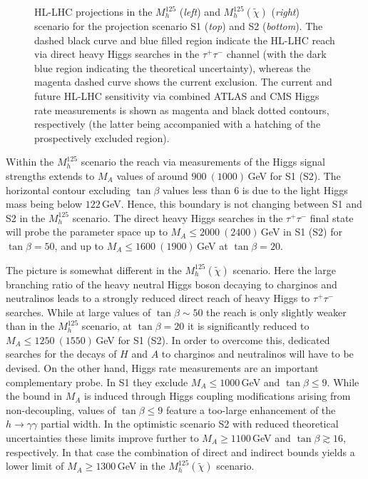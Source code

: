 \documentclass[../report.tex]{subfiles}
\begin{document}
\begin{figure}
\begin{center}
\end{center}
\caption{HL-LHC projections in the $M_h^{125}$ (\emph{left}) and
  $M_h^{125}(\tilde{\chi})$ (\emph{right}) scenario for the projection scenario S1 (\emph{top}) and S2 (\emph{bottom}). The dashed black curve and blue filled region indicate the HL-LHC reach via direct heavy Higgs searches in the $\tau^+\tau^-$ channel (with the dark blue region indicating the theoretical uncertainty), whereas the magenta dashed curve shows the current exclusion. The current and future HL-LHC sensitivity via  combined ATLAS and CMS Higgs rate measurements is shown as magenta and black dotted contours, respectively (the latter being accompanied with a hatching of the prospectively excluded region).}
\label{fig:bench}
\end{figure}

Within the $M_h^{125}$ scenario the reach via measurements of the Higgs signal strengths extends to $M_A$ values of around $900~(1000)$\,GeV for S1 (S2). The horizontal contour excluding $\tan\beta$ values less than 6 is due to the light Higgs mass being below $122$\,GeV. Hence, this boundary is not changing between S1 and S2 in the $M_h^{125}$ scenario. The direct heavy Higgs searches in the $\tau^+\tau^-$ final state will probe the parameter space up to $M_A \le 2000~(2400)$\,GeV in S1 (S2) for $\tan\beta = 50$, and up to $M_A \le 1600~(1900)$\,GeV at $\tan\beta = 20$. 

The picture is somewhat different in the $M_h^{125}(\tilde{\chi})$ scenario. Here the large branching ratio of the heavy neutral Higgs boson decaying to charginos and neutralinos leads to a strongly reduced direct reach of heavy Higgs to $\tau^+\tau^-$ searches. While at large values of $\tan\beta \sim 50$  the reach is only slightly weaker than in the $M_h^{125}$ scenario, at $\tan\beta = 20$ it is significantly reduced to $M_A \le 1250~(1550)$\,GeV for S1 (S2). In order to overcome this, dedicated searches for the decays of $H$ and $A$ to charginos and neutralinos will have to be devised. On the other hand, Higgs rate measurements are an important complementary probe. In S1 they exclude
$M_A \le 1000$\,GeV and $\tan\beta \le 9$. While the bound in $M_A$
is induced through Higgs coupling modifications arising from
non-decoupling, values of $\tan\beta\le 9$ feature a too-large enhancement of the $h\to \gamma\gamma$ partial width. In the optimistic scenario S2 with reduced theoretical uncertainties these limits improve further to $M_A \ge 1100$\,GeV and $\tan\beta \gtrsim 16$, respectively.
In that case the combination of direct and indirect bounds yields
a lower limit of $M_A \ge 1300$\,GeV in the $M_h^{125}(\tilde{\chi})$ scenario.
\end{document}
